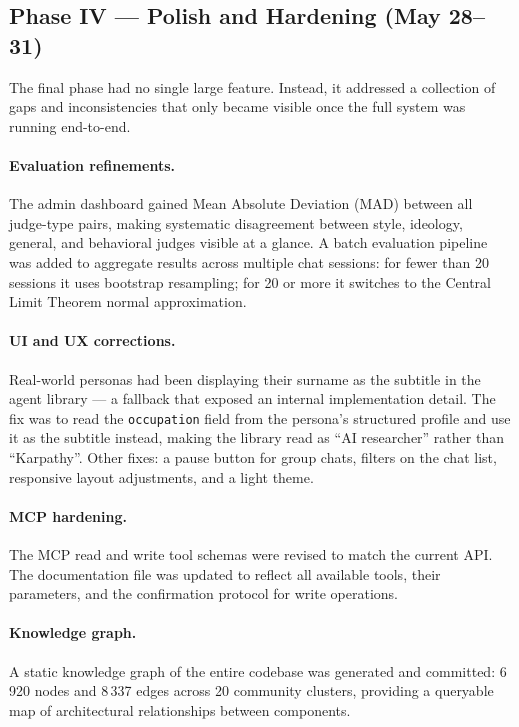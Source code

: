 \documentclass[12pt,a4paper]{article}
\begin{document}
\subsection{Phase IV --- Polish and Hardening (May 28--31)}

The final phase had no single large feature. Instead, it addressed a collection of gaps and
inconsistencies that only became visible once the full system was running end-to-end.

\paragraph{Evaluation refinements.}
The admin dashboard gained Mean Absolute Deviation (MAD) between all judge-type pairs, making
systematic disagreement between style, ideology, general, and behavioral judges visible at a
glance. A batch evaluation pipeline was added to aggregate results across multiple chat
sessions: for fewer than 20 sessions it uses bootstrap resampling; for 20 or more it switches
to the Central Limit Theorem normal approximation.

\paragraph{UI and UX corrections.}
Real-world personas had been displaying their surname as the subtitle in the agent library ---
a fallback that exposed an internal implementation detail. The fix was to read the
\texttt{occupation} field from the persona's structured profile and use it as the subtitle
instead, making the library read as ``AI researcher'' rather than ``Karpathy''. Other fixes:
a pause button for group chats, filters on the chat list, responsive layout adjustments, and
a light theme.

\paragraph{MCP hardening.}
The MCP read and write tool schemas were revised to match the current API. The documentation
file was updated to reflect all available tools, their parameters, and the confirmation
protocol for write operations.

\paragraph{Knowledge graph.}
A static knowledge graph of the entire codebase was generated and committed: 6\,920 nodes and
8\,337 edges across 20 community clusters, providing a queryable map of architectural
relationships between components.
\end{document}
